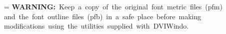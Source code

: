 \def\AFM{{\sc afm}}
\def\INF{{\sc inf}}
\def\TFM{{\sc tfm}}
\def\PFM{{\sc pfm}}
\def\DVI{{\sc dvi}}

\def\VEC{{\sc vec}}

\def\PS{{\sc ps}}
\def\PK{{\sc pk}}

\def\PFA{{\sc pfa}}
\def\PFB{{\sc pfb}}

\def\EPS{{\sc eps}}

\def\EPSF{{\sc epsf}}
\def\EPSI{{\sc epsi}}

\def\PSFIG{{\sc psfig}}

\def\PIF{{\sc pif}}

\def\DSC{{\sc dsc}}


\def\ATM{{\sc atm}}

\def\ATMINI{{\tt atm.ini}}
\def\WININI{{\tt win.ini}}

\def\ATMQLC{{\tt atmfonts.qlc}}

\def\PSCRIPT{{\sc pscript.drv}}

\def\PFM{{\sc pfm}}
\def\PFB{{\sc pfb}}

\def\CM{{\sc cm}}



\def\IBM{{\sc ibm}}
\def\PC{{\sc pc}}


\def\TUG{{\sc tug}}

\def\SMARTDRV{{\sc smart\-drv.exe}}
\def\RAMDRV{{\sc ram\-drv.sys}}
\def\RAM{{\sc ram}}

\def\AUTOEXEC{{\tt auto\-exec.bat}}

\def\UNIX{{\sc unix}}
\def\DVIPS{{\sc dvips}}
\def\DVITWOPS{{\sc dvi2ps}}
\def\DVIALW{{\sc dvialw}}
\def\DVITOPS{{\sc dvitops}}
\def\DVILASER{{\sc dvilaser/ps}}


\newbox\boxa

\setbox\boxa=\vbox{
\hbox{{\bf WARNING:} Keep a copy of the original font metric files ({\PFM})}
\hbox{and the font outline files ({\PFB}) in a safe place before making}
\hbox{modifications using the utilities supplied with {DVI\-Windo}.}
}

\def\warning{\centerline{\boxit{\copy\boxa}}}

